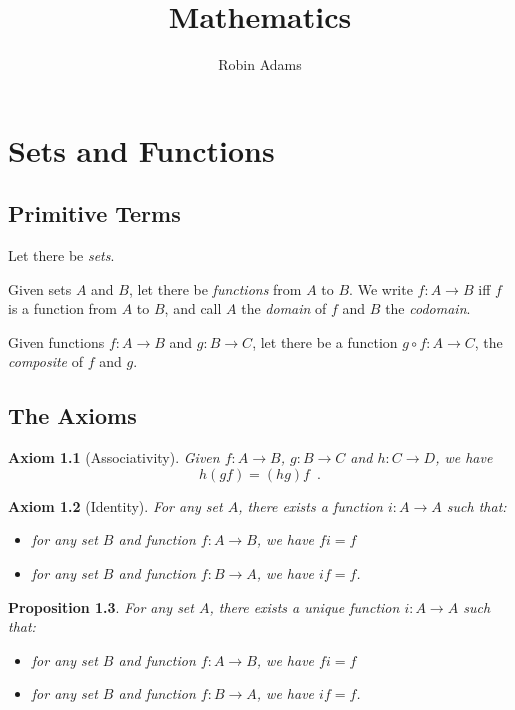 \documentclass{book}
\title{Mathematics}
\author{Robin Adams}
\newtheorem{ax}{Axiom}[chapter]
\newtheorem{prop}[ax]{Proposition}
\theoremstyle{definition}
\begin{document}
\maketitle
\tableofcontents

\chapter{Sets and Functions}

\section{Primitive Terms}

Let there be \emph{sets}.

Given sets $A$ and $B$, let there be \emph{functions} from $A$ to $B$. We write $f : A \rightarrow B$ iff $f$ is a function from $A$ to $B$, and call $A$ the \emph{domain} of $f$ and $B$ the \emph{codomain}.

Given functions $f : A \rightarrow B$ and $g : B \rightarrow C$, let there be a function $g \circ f : A \rightarrow C$, the \emph{composite} of $f$ and $g$.

\section{The Axioms}

\begin{ax}[Associativity]
Given $f : A \rightarrow B$, $g : B \rightarrow C$ and $h : C \rightarrow D$, we have
\[ h (gf) = (hg) f \enspace . \]
\end{ax}

\begin{ax}[Identity]
For any set $A$, there exists a function $i : A \rightarrow A$ such that:
\begin{itemize}
\item for any set $B$ and function $f : A \rightarrow B$, we have $fi = f$
\item for any set $B$ and function $f : B \rightarrow A$, we have $if = f$.
\end{itemize}
\end{ax}

\begin{prop}
For any set $A$, there exists a unique function $i : A \rightarrow A$ such that:
\begin{itemize}
\item for any set $B$ and function $f : A \rightarrow B$, we have $fi = f$
\item for any set $B$ and function $f : B \rightarrow A$, we have $if = f$.
\end{itemize}
\end{prop}
\end{document}
